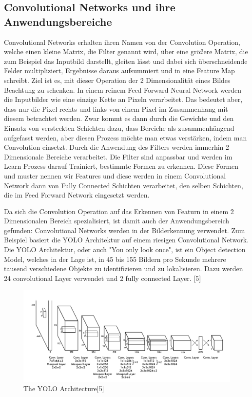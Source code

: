 \documentclass[12pt]{article}
\begin{document}
\subsection{Convolutional Networks und ihre Anwendungsbereiche}
Convolutional Networks erhalten ihren Namen von der Convolution Operation, welche einen kleine Matrix, die Filter genannt wird, über eine größere Matrix, die zum Beispiel das Inputbild darstellt, gleiten lässt und dabei sich überschneidende Felder multipliziert, Ergebnisse daraus aufsummiert und in eine Feature Map schreibt. Ziel ist es, mit dieser Operation der 2 Dimensionalität eines Bildes Beachtung zu schenken. In einem reinem Feed Forward Neural Network werden die Inputbilder wie eine einzige Kette an Pixeln verarbeitet. Das bedeutet aber, dass nur die Pixel rechts und links von einem Pixel im Zusammenhang mit diesem betrachtet werden. Zwar kommt es dann durch die Gewichte und den Einsatz von versteckten Schichten dazu, dass Bereiche als zusammenhängend aufgefasst werden, aber diesen Prozess möchte man etwas verstärken, indem man Convolution einsetzt. Durch die Anwendung des Filters werden immerhin 2 Dimensionale Bereiche verarbeitet. Die Filter sind anpassbar und werden im Learn Prozess darauf Trainiert, bestimmte Formen zu erkennen. Diese Formen und muster nennen wir Features und diese werden in einem Convolutional Network dann von Fully Connected Schichten verarbeitet, den selben Schichten, die im Feed Forward Network eingesetzt werden. 

Da sich die Convolution Operation auf das Erkennen von Featurn in einem 2 Dimensionalen Bereich spezialisiert, ist damit auch der Anwendungsbereich gefunden: Convolutional Networks werden in der Bilderkennung verwendet.
Zum Beispiel basiert die YOLO Architektur auf einem riesigen Convolutional Network. Die YOLO Architektur, oder auch "You only look once", ist ein Object detection Model, welches in der Lage ist, in 45 bis 155 Bildern pro Sekunde mehrere tausend verschiedene Objekte zu identifizieren und zu lokalisieren. Dazu werden 24 convolutional Layer verwendet und 2 fully connected Layer. [5]

\begin{figure}[H]
\centering
\includegraphics[scale=0.38]{Images/007_YOLO.png}
\caption{The YOLO Architecture[5]}
\label{The YOLO Architecture[5]}
\end{figure}
\end{document}
